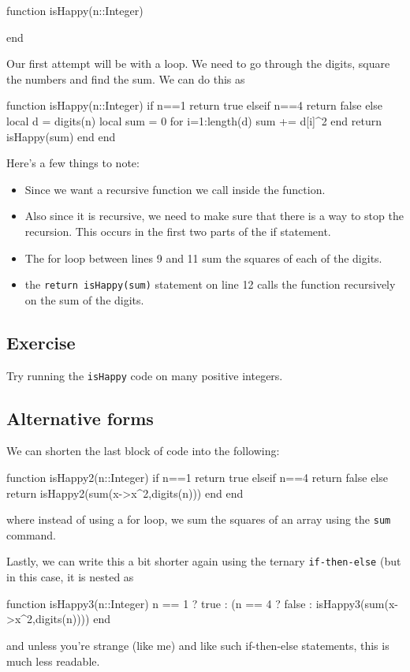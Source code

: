 \begin{jlblock}[nt]
function isHappy(n::Integer)

end
\end{jlblock}

Our first attempt will be with a loop.  We need to go through the digits, square the numbers and find the sum.  We can do this as
%
\begin{jlblock}[nt][numbers=left]
function isHappy(n::Integer)
  if n==1
    return true
  elseif n==4 
    return false
  else 
    local d = digits(n)
    local sum = 0
    for i=1:length(d)
      sum += d[i]^2
    end
    return isHappy(sum)
  end
end
\end{jlblock}

Here's a few things to note:
\begin{itemize}
\item Since we want a recursive function we call  inside the function.
\item Also since it is recursive, we need to make sure that there is a way to stop the recursion.  This occurs in the first two parts of the if statement.
\item The for loop between lines 9 and 11 sum the squares of each of the digits.
\item the \verb!return isHappy(sum)! statement on line 12 calls the function recursively on the sum of the digits.  
\end{itemize}

\subsection{Exercise}

Try running the \verb!isHappy! code on many positive integers. 

\subsection{Alternative forms}

We can shorten the last block of code into the following:
\begin{jlblock}[nt]
function isHappy2(n::Integer)
  if n==1
    return true
  elseif n==4 
    return false
  else 
    return isHappy2(sum(x->x^2,digits(n)))
  end
end
\end{jlblock}
where instead of using a for loop, we sum the squares of an array using the \texttt{sum} command. 

Lastly, we can write this a bit shorter again using the ternary \texttt{if-then-else} (but in this case, it is nested as
\begin{jlblock}[nt]
function isHappy3(n::Integer)
  n == 1 ? true : (n == 4 ? false : isHappy3(sum(x->x^2,digits(n))))
end
\end{jlblock}
%
and unless you're strange (like me) and like such if-then-else statements, this is much less readable. 

